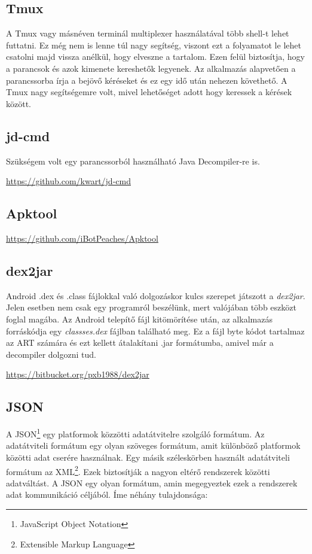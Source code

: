 \documentclass{thesis-ekf}
\theoremstyle{definition}
\theoremstyle{remark}
\begin{document}
\subsection{Tmux}

A Tmux vagy másnéven terminál multiplexer használatával több shell-t lehet futtatni.
Ez még nem is lenne túl nagy segítség, viszont ezt a folyamatot le lehet csatolni majd vissza anélkül, hogy elveszne a tartalom.
Ezen felül biztosítja, hogy a parancsok és azok kimenete kereshetők legyenek.
Az alkalmazás alapvetően a parancssorba írja a bejövő kéréseket és ez egy idő után nehezen követhető.
A Tmux nagy segítségemre volt, mivel lehetőséget adott hogy keressek a kérések között.

\subsection{jd-cmd}

Szükségem volt egy parancssorból használható Java Decompiler-re is. 

\url{https://github.com/kwart/jd-cmd}

\subsection{Apktool}

\url{https://github.com/iBotPeaches/Apktool}

\subsection{dex2jar}

Android .dex és .class fájlokkal való dolgozáskor kulcs szerepet játszott a \emph{dex2jar}. Jelen esetben nem csak egy programról beszélünk, mert valójában több eszközt foglal magába.
Az Android telepítő fájl kitömörítése után, az alkalmazás forráskódja egy \emph{classses.dex} fájlban található meg.
Ez a fájl byte kódot tartalmaz az ART számára és ezt kellett átalakítani .jar formátumba, amivel már a decompiler dolgozni tud.

\url{https://bitbucket.org/pxb1988/dex2jar}

\subsection{JSON}

A JSON\footnote{JavaScript Object Notation} egy platformok közzötti adatátvitelre szolgáló formátum.
Az adatátviteli formátum egy olyan szöveges formátum, amit különböző platformok közötti adat cserére használnak.
Egy másik széleskörben használt adatátviteli formátum az XML\footnote{Extensible Markup Language}.
Ezek biztosítják a nagyon eltérő rendszerek közötti adatváltást.
A JSON egy olyan formátum, amin megegyeztek ezek a rendszerek adat kommunikáció céljából.
Íme néhány tulajdonsága:
\end{document}
